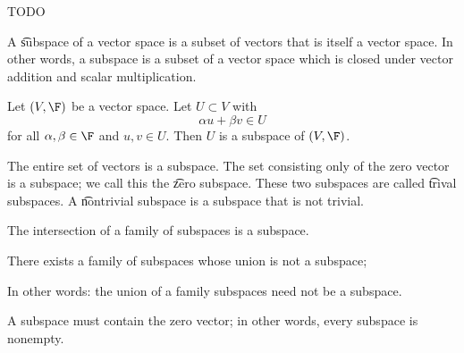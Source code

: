 
\sbasic





























\sstart
{}


TODO


A \t{subspace} of a vector space is a subset of vectors that is itself a vector space.
In other words, a subspace is a subset of a vector space which is closed under vector addition and scalar multiplication.


Let $(V, \F)$ be a vector space.
Let $U \subset V$ with
$$
  \alpha u + \beta v \in U
$$
for all $\alpha, \beta \in \F$ and $u, v \in U$.
Then $U$ is a subspace of $(V, \F)$.


The entire set of vectors is a subspace.
The set consisting only of the zero vector is a subspace; we call this the \t{zero subspace}.
These two subspaces are called \t{trival subspaces}.
A \t{nontrivial subspace} is a subspace that is not trivial.


\begin{prop}
  The intersection of a family of subspaces is a subspace.
\end{prop}

\begin{prop}
  There exists a family of subspaces whose union is not a subspace;

  \begin{remark}
  In other words: the union of a family subspaces need not be a subspace.
  \end{remark}

\end{prop}

\begin{prop}
  A subspace must contain the zero vector; in other words, every subspace is nonempty.
\end{prop}
\strats
